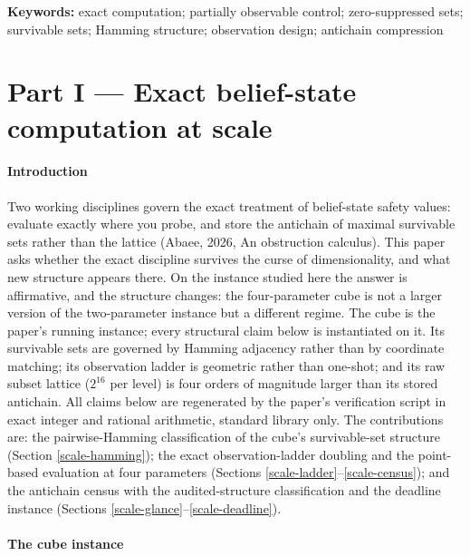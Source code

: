 \documentclass[10pt,twocolumn]{article}
\theoremstyle{plain}
\theoremstyle{definition}
\theoremstyle{remark}
\begin{document}
\textbf{Keywords:} exact computation; partially observable control;
zero-suppressed sets; survivable sets; Hamming structure; observation
design; antichain compression

\part*{Part I --- Exact belief-state computation at scale}
\label{part:scale}

\subsection{Introduction}\label{scale-introduction}

Two working disciplines govern the exact treatment of belief-state safety values: evaluate exactly where you probe, and store the antichain of maximal survivable sets rather than the lattice (Abaee, 2026, An obstruction calculus). This paper asks whether the exact discipline survives the curse of dimensionality, and what new structure appears there. On the instance studied here the answer is affirmative, and the structure changes: the four-parameter cube is not a larger version of the two-parameter instance but a different regime. The cube is the paper's running instance; every structural claim below is instantiated on it.
Its survivable sets are governed by Hamming adjacency rather than by
coordinate matching; its observation ladder is geometric rather than
one-shot; and its raw subset lattice (\(2^{16}\) per level) is four
orders of magnitude larger than its stored antichain. All claims below
are regenerated by the paper's verification script in exact integer
and rational arithmetic, standard library only. The contributions are:
the pairwise-Hamming classification of the cube's survivable-set
structure (Section \ref{scale-hamming}); the exact observation-ladder
doubling and the point-based evaluation at four parameters (Sections
\ref{scale-ladder}--\ref{scale-census}); and the antichain census with the
audited-structure classification and the deadline instance (Sections
\ref{scale-glance}--\ref{scale-deadline}).

\subsection{The cube instance}\label{scale-instance}
\end{document}
